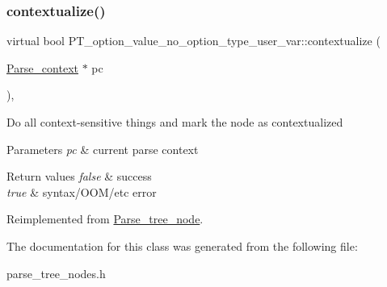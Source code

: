 \subsubsection{\texorpdfstring{contextualize()}{contextualize()}}
{\footnotesize\ttfamily virtual bool P\+T\+\_\+option\+\_\+value\+\_\+no\+\_\+option\+\_\+type\+\_\+user\+\_\+var\+::contextualize (\begin{DoxyParamCaption}\item[{\mbox{\hyperlink{structParse__context}{Parse\+\_\+context}} $\ast$}]{pc }\end{DoxyParamCaption})\hspace{0.3cm}{\ttfamily [inline]}, {\ttfamily [virtual]}}

Do all context-\/sensitive things and mark the node as contextualized


\begin{DoxyParams}{Parameters}
{\em pc} & current parse context\\
\hline
\end{DoxyParams}

\begin{DoxyRetVals}{Return values}
{\em false} & success \\
\hline
{\em true} & syntax/\+O\+O\+M/etc error \\
\hline
\end{DoxyRetVals}


Reimplemented from \mbox{\hyperlink{classParse__tree__node_a22d93524a537d0df652d7efa144f23da}{Parse\+\_\+tree\+\_\+node}}.



The documentation for this class was generated from the following file\+:\begin{DoxyCompactItemize}
\item 
parse\+\_\+tree\+\_\+nodes.\+h\end{DoxyCompactItemize}
